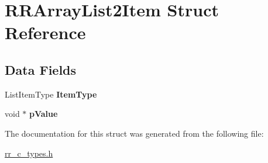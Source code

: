\hypertarget{struct_r_r_array_list2_item}{
\section{\-R\-R\-Array\-List2\-Item \-Struct \-Reference}
\label{struct_r_r_array_list2_item}
}
\subsection*{\-Data \-Fields}
\begin{DoxyCompactItemize}
\item 
\hypertarget{struct_r_r_array_list2_item_af69273b36c37b84e5c91a0c9d1af3a15}{
\-List\-Item\-Type {\bfseries \-Item\-Type}}
\label{struct_r_r_array_list2_item_af69273b36c37b84e5c91a0c9d1af3a15}

\item 
\hypertarget{struct_r_r_array_list2_item_a63ad54c993b6ca0d76f718dc1a1164c3}{
void $\ast$ {\bfseries p\-Value}}
\label{struct_r_r_array_list2_item_a63ad54c993b6ca0d76f718dc1a1164c3}

\end{DoxyCompactItemize}


\-The documentation for this struct was generated from the following file\-:\begin{DoxyCompactItemize}
\item 
\hyperlink{rr__c__types_8h}{rr\-\_\-c\-\_\-types.\-h}\end{DoxyCompactItemize}
